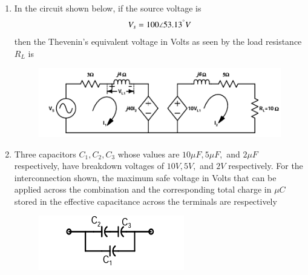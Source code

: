 \documentclass[journal,12pt,onecolumn]{IEEEtran}
\theoremstyle{remark}
\begin{document}
\begin{enumerate}
\begin{enumerate}
\end{enumerate}


\item In the circuit shown below, if the source voltage is 
\begin{align*}
    V_s = 100 \angle 53.13^\degree V
\end{align*}
then the Thevenin's equivalent voltage in Volts as seen by the load resistance $R_L$ is
\begin{figure}[h]
    \centering
    \includegraphics[width=0.5\columnwidth]{figs/12.png}
    \label{fig:placeholder}
\end{figure}
\begin{enumerate}
\end{enumerate}


\item Three capacitors $C_1, C_2, C_3$ whose values are $10\mu F, 5\mu F,$ and $2\mu F$ respectively, have breakdown voltages of $10V, 5V,$ and $2V$ respectively. For the interconnection shown, the maximum safe voltage in Volts that can be applied across the combination and the corresponding total charge in $\mu C$ stored in the effective capacitance across the terminals are respectively
\begin{figure}[h]
    \centering
    \includegraphics[width=0.5\columnwidth]{figs/13.png}
    \label{fig:placeholder}
\end{figure}
\begin{enumerate}
\begin{multicols}{4}
    


\end{multicols}
\end{enumerate}
\end{enumerate}
\end{document}
